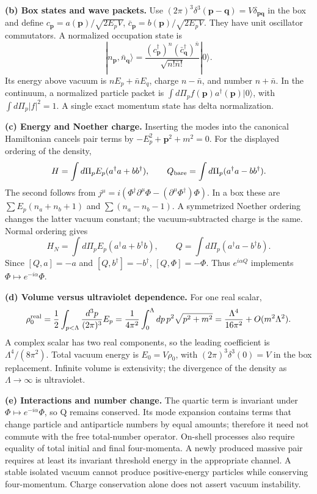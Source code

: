 \documentclass[11pt]{article}
\newcommand{\partsol}[2]{\par\Needspace{4\baselineskip}\medskip\noindent\textbf{(#1) #2.}\quad}
\begin{document}
\partsol{b}{Box states and wave packets}
Use \((2\pi)^3\delta^3(\bm p-\bm q)=V\delta_{\bm p\bm q}\) in the
box and define \(c_{\bm p}=a(\bm p)/\sqrt{2E_pV}\),
\(\bar c_{\bm p}=b(\bm p)/\sqrt{2E_pV}\).
They have unit oscillator commutators. A normalized occupation state is
\[
 |n_{\bm p},\bar n_{\bm q}\rangle
 =\frac{(c_{\bm p}^\dagger)^n(\bar c_{\bm q}^\dagger)^{\bar n}}
        {\sqrt{n!\bar n!}}|0\rangle.
\]
Its energy above vacuum is \(nE_p+\bar nE_q\), charge \(n-\bar n\),
and number \(n+\bar n\). In the continuum, a normalized particle packet
is \(\int d\Pi_p f(\bm p)a^\dagger(\bm p)|0\rangle\), with
\(\int d\Pi_p|f|^2=1\). A single exact momentum state has delta normalization.

\partsol{c}{Energy and Noether charge}
Inserting the modes into the canonical Hamiltonian cancels pair terms
by \(-E_p^2+\bm p^2+m^2=0\). For the displayed ordering of the density,
\[
 H=\int d\Pi_p E_p(a^\dagger a+bb^\dagger),\qquad
 Q_{\rm bare}=\int d\Pi_p(a^\dagger a-bb^\dagger).
\]
The second follows from \(j^\mu=i(\Phi^\dagger\partial^\mu\Phi-
(\partial^\mu\Phi^\dagger)\Phi)\).
In a box these are \(\sum E_p(n_a+n_b+1)\) and
\(\sum(n_a-n_b-1)\). A symmetrized Noether ordering changes the latter
vacuum constant; the vacuum-subtracted charge is the same. Normal ordering gives
\[
 H_N=\int d\Pi_p E_p(a^\dagger a+b^\dagger b),\qquad
 Q=\int d\Pi_p(a^\dagger a-b^\dagger b).
\]
Since \([Q,a]=-a\) and \([Q,b^\dagger]=-b^\dagger\),
\([Q,\Phi]=-\Phi\). Thus \(e^{i\alpha Q}\) implements \(\Phi\mapsto e^{-i\alpha}\Phi\).

\partsol{d}{Volume versus ultraviolet dependence}
For one real scalar,
\[
 \rho_0^{\rm real}=\frac12\int_{p<\Lambda}\frac{d^3p}{(2\pi)^3}E_p
 =\frac1{4\pi^2}\int_0^\Lambda dp\,p^2\sqrt{p^2+m^2}
 =\frac{\Lambda^4}{16\pi^2}+O(m^2\Lambda^2).
\]
A complex scalar has two real components, so the leading coefficient is
\(\Lambda^4/(8\pi^2)\). Total vacuum energy is \(E_0=V\rho_0\), with
\((2\pi)^3\delta^3(0)=V\) in the box replacement. Infinite volume is
extensivity; the divergence of the density as \(\Lambda\to\infty\) is ultraviolet.

\partsol{e}{Interactions and number change}
The quartic term is invariant under \(\Phi\mapsto e^{-i\alpha}\Phi\),
so Q remains conserved. Its mode expansion contains terms that change
particle and antiparticle numbers by equal amounts; therefore it need
not commute with the free total-number operator. On-shell processes
also require equality of total initial and final four-momenta.
A newly produced massive pair requires at least its invariant threshold
energy in the appropriate channel. A stable isolated vacuum cannot
produce positive-energy particles while conserving four-momentum.
Charge conservation alone does not assert vacuum instability.
\end{document}
